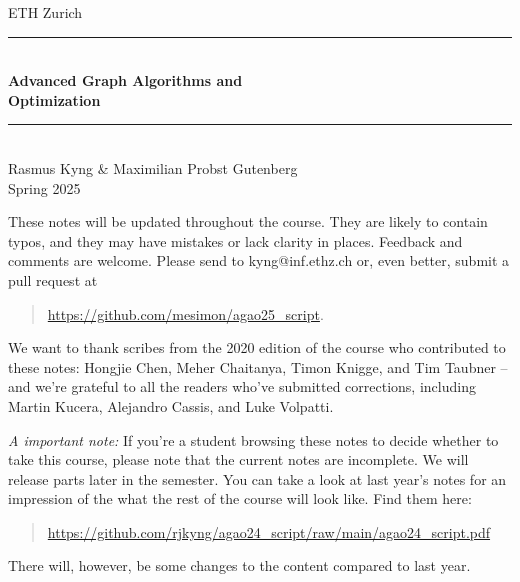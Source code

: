 \documentclass[12pt,a4paper,openany]{book}
\begin{document}
%
%
\begin{titlepage}

\newcommand{\HRule}{\rule{\linewidth}{0.5mm}} %
{\center

{\Large ETH Zurich}\\[1.5cm]
\HRule \\[0.4cm]
{ \huge \bfseries Advanced Graph Algorithms and \\ Optimization}\\[0.4cm] %
\HRule \\[1.5cm]

{\LARGE Rasmus Kyng \& Maximilian Probst Gutenberg}\\[2cm]


{\Large Spring 2025}\\[2cm] %

}
\vfill




\end{titlepage}

These notes will be updated throughout the course.
They are likely to contain typos, and they may have mistakes or
lack clarity in places. Feedback and comments are 
welcome. Please send to kyng@inf.ethz.ch or, even better, submit a pull request at
\begin{quote}
  \url{https://github.com/mesimon/agao25_script}.
\end{quote}


We want to thank scribes from the 2020 edition of the course who
contributed to these notes: Hongjie
Chen, Meher Chaitanya, Timon Knigge, and Tim Taubner -- and we're
grateful to all the readers who've submitted corrections, including
Martin Kucera, Alejandro Cassis, and Luke Volpatti.

\emph{A important note:} If you're a student browsing these notes to
decide whether to take this course, please note that the current notes
are incomplete. We will release parts later in the
semester.
You can take a look at last year's notes for an impression of the
what the rest of the course will look like. Find them here:
\begin{quote}
  \url{https://github.com/rjkyng/agao24_script/raw/main/agao24_script.pdf}
\end{quote}
There will, however, be some changes to the content compared to last year.
\end{document}
